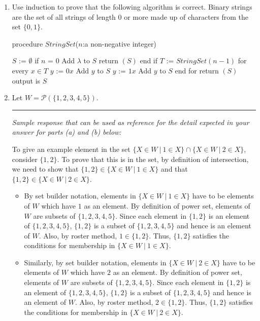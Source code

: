 \documentclass[12pt, oneside]{article}
\begin{document}
\begin{enumerate}
\newpage
\item Use induction to prove that the following algorithm is correct. Binary strings are the set of all strings of length 0 or more made up of characters from the set $\{0, 1\}$.


\begin{algorithm}[caption={Recursively computing the set of all binary strings of a fixed length $n$}]
procedure $\textit{StringSet}$($n$:a non-negative integer)

$S$ := $\emptyset$
if $n$ = $0$
    Add $\lambda$ to $S$
    return $(S)$ 
end if
$T$ := $StringSet(n-1)$
for every $x\in T$
    $y$ := $0x$
    Add $y$ to $S$
    $y$ := $1x$
    Add $y$ to $S$
end for
return $(S)$ {output is $S$}

    
\end{algorithm}



\item Let $W = \mathcal{P}(\{1,2,3,4,5\})$. 
\label{proof_powerset}

\rule{0.5\textwidth}{.4pt}

{\it Sample response that can be used as reference for the detail expected 
in your answer for parts (a) and (b) below:} 

To give an example element in the set 
$\{ X \in W ~|~ 1 \in X \} \cap \{ X \in W ~|~  2 \in X \}$,
consider $\{ 1,2\}$. To prove that this is in the set, by definition of intersection, we need to show
that $\{1,2\} \in \{ X \in W ~|~ 1 \in X \}$ and that $\{1,2\} \in \{ X \in W ~|~ 2 \in X \}$.
\begin{itemize}
\item By set builder notation, elements in $\{ X \in W ~|~ 1 \in X \}$ have to be elements of $W$ which have $1$ as an element. By definition of power set, elements of $W$ are subsets of $\{1,2,3,4,5\}$. Since
each element in $\{1,2\}$ is an element of $\{1,2,3,4,5\}$, $\{1,2\}$ is a subset of $\{1,2,3,4,5\}$ 
and hence is an element of $W$. Also, by roster method, $1 \in \{1,2\}$. Thus, $\{1,2\}$ satisfies the 
conditions for membership in $\{ X \in W ~|~ 1 \in X \}$.
\item Similarly, by set builder notation, elements in $\{ X \in W ~|~ 2 \in X \}$ have to be elements of $W$ 
which have $2$ as an element. 
By definition of power set, elements of $W$ are subsets of $\{1,2,3,4,5\}$. Since
each element in $\{1,2\}$ is an element of $\{1,2,3,4,5\}$, $\{1,2\}$ is a subset of $\{1,2,3,4,5\}$ 
and hence is an element of $W$. Also, by roster method, $2 \in \{1,2\}$. Thus, $\{1,2\}$ satisfies the 
conditions for membership in $\{ X \in W ~|~ 2 \in X \}$.
\end{itemize}


\end{enumerate}
\end{document}
